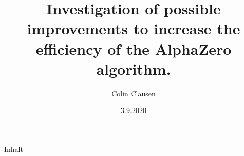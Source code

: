 \documentclass[11pt]{beamer}
\title[Investigation of improvements to AlphaZero]{Investigation of possible improvements to increase the efficiency of the AlphaZero algorithm.}
\author{Colin Clausen}
\date{3.9.2020}
\begin{document}
	 \frame{\titlepage}

        \begin{frame}{Inhalt}
	\scriptsize{\tableofcontents[hideallsubsections]}
	\end{frame}
		
\end{document}
